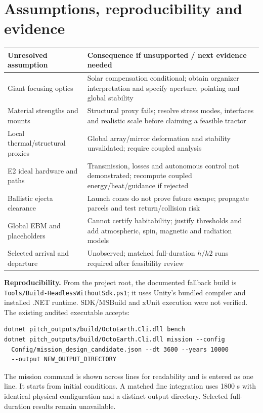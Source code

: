 ﻿\documentclass[10pt,a4paper]{article}
\newcommand{\file}[1]{{\footnotesize\nolinkurl{#1}}}
\begin{document}
\section{Assumptions, reproducibility and evidence}
\par\smallskip
{\small\noindent\begin{tabularx}{\linewidth}{@{}L{30mm}X@{}}\toprule
Unresolved assumption & Consequence if unsupported / next evidence needed\\\midrule
Giant focusing optics & Solar compensation conditional; obtain organizer interpretation and specify aperture, pointing and global stability\\
Material strengths and mounts & Structural proxy fails; resolve stress modes, interfaces and realistic scale before claiming a feasible tractor\\
Local thermal/structural proxies & Global array/mirror deformation and stability unvalidated; require coupled analysis\\
E2 ideal hardware and paths & Transmission, losses and autonomous control not demonstrated; recompute coupled energy/heat/guidance if rejected\\
Ballistic ejecta clearance & Launch cones do not prove future escape; propagate parcels and test return/collision risk\\
Global EBM and placeholders & Cannot certify habitability; justify thresholds and add atmospheric, spin, magnetic and radiation models\\
Selected arrival and departure & Unobserved; matched full-duration $h/h2$ runs required after feasibility review\\\bottomrule
\end{tabularx}\par}
\smallskip


\textbf{Reproducibility.} From the project root, the documented fallback build is \file{Tools/Build-HeadlessWithoutSdk.ps1}; it uses Unity's bundled compiler and installed .NET runtime. SDK/MSBuild and xUnit execution were not verified. The existing audited executable accepts:
{\footnotesize\begin{verbatim}
dotnet pitch_outputs/build/OctoEarth.Cli.dll bench
dotnet pitch_outputs/build/OctoEarth.Cli.dll mission --config
  Config/mission_design_candidate.json --dt 3600 --years 10000
  --output NEW_OUTPUT_DIRECTORY
\end{verbatim}}
The mission command is shown across lines for readability and is entered as one line. It starts from initial conditions. A matched fine integration uses 1800 s with identical physical configuration and a distinct output directory. Selected full-duration results remain unavailable.
\end{document}
